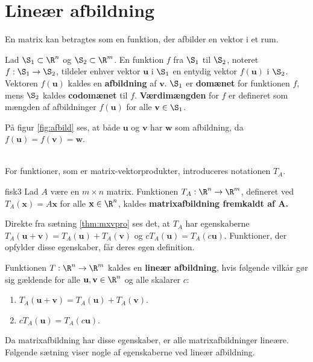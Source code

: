\section{Lineær afbildning}
%
En matrix kan betragtes som en funktion, der afbilder en vektor i et rum.
%
\begin{defn}{}{}
Lad $\S _1 \subset \R^n$ og $\S _2 \subset \R^m$.
En funktion $f$ fra $\S_1$ til $\S_2$, noteret $f:\S_1\rightarrow\S_2$, tildeler enhver vektor $\textbf{u}$ i $\S_1$ en entydig vektor $f(\textbf{u})$ i $\S_2$.
Vektoren $f(\textbf{u})$ kaldes en \textbf{afbildning} af $\textbf{v}$.
$\S_1$ er \textbf{domænet} for funktionen $f$, mens $\S_2$ kaldes \textbf{codomænet} til $f$.
\textbf{Værdimængden} for $f$ er defineret som mængden af afbildninger $f(\textbf{u})$ for alle $\textbf{v}\in \S_1$.
\end{defn}\noindent
%
På figur \ref{fig:afbild} ses, at både $\textbf{u}$ og $\textbf{v}$ har $\textbf{w}$ som afbildning, da $f(\textbf{u})=f(\textbf{v})=\textbf{w}$.

%
\\
For funktioner, som er matrix-vektorprodukter, introduceres notationen $T_A$.
%
\begin{defn}{}{fisk3}
Lad $A$ være en $m \times n$ matrix.
Funktionen $T_A:\R^n \rightarrow \R^m$, defineret ved $T_A(\textbf{x}) = A\textbf{x}$ for alle $\textbf{x} \in \R^n$, kaldes \textbf{matrixafbildning fremkaldt af $\mathbf{A}$.}
\end{defn}\noindent
%
Direkte fra sætning \ref{thm:mxvpro} ses det, at $T_A$ har egenskaberne $T_A(\textbf{u}+\textbf{v})=T_A(\textbf{u}) + T_A(\textbf{v})$ og $cT_A(\textbf{u}) = T_A(c\textbf{u})$.
Funktioner, der opfylder disse egenskaber, får deres egen definition.
%
\begin{defn}{}{}
Funktionen $T: \R^n \rightarrow \R^m$ kaldes en \textbf{lineær afbildning}, hvis følgende vilkår gør sig gældende for alle $\textbf{u},\textbf{v} \in \R^n$ og alle skalarer $c$:
\begin{enumerate}[label=(\alph*)]
\item $T_A(\textbf{u}+\textbf{v})=T_A(\textbf{u}) + T_A(\textbf{v})$.
\item $cT_A(\textbf{u}) = T_A(c\textbf{u})$.
\end{enumerate}
\end{defn}\noindent
%
Da matrixafbildning har disse egenskaber, er alle matrixafbildninger lineære.
Følgende sætning viser nogle af egenskaberne ved lineær afbildning.
